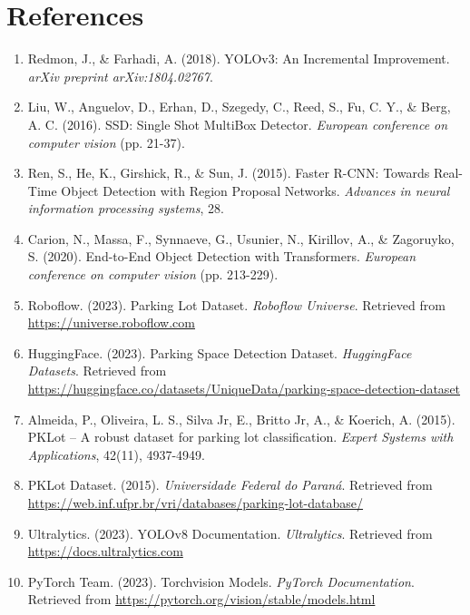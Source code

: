 \documentclass[12pt,a4paper]{article}
\begin{document}
\section{References}

\begin{enumerate}
    \item Redmon, J., \& Farhadi, A. (2018). YOLOv3: An Incremental Improvement. \textit{arXiv preprint arXiv:1804.02767}.
    
    \item Liu, W., Anguelov, D., Erhan, D., Szegedy, C., Reed, S., Fu, C. Y., \& Berg, A. C. (2016). SSD: Single Shot MultiBox Detector. \textit{European conference on computer vision} (pp. 21-37).
    
    \item Ren, S., He, K., Girshick, R., \& Sun, J. (2015). Faster R-CNN: Towards Real-Time Object Detection with Region Proposal Networks. \textit{Advances in neural information processing systems}, 28.
    
    \item Carion, N., Massa, F., Synnaeve, G., Usunier, N., Kirillov, A., \& Zagoruyko, S. (2020). End-to-End Object Detection with Transformers. \textit{European conference on computer vision} (pp. 213-229).
    
    \item Roboflow. (2023). Parking Lot Dataset. \textit{Roboflow Universe}. Retrieved from \url{https://universe.roboflow.com}
    
    \item HuggingFace. (2023). Parking Space Detection Dataset. \textit{HuggingFace Datasets}. Retrieved from \url{https://huggingface.co/datasets/UniqueData/parking-space-detection-dataset}
    
    \item Almeida, P., Oliveira, L. S., Silva Jr, E., Britto Jr, A., \& Koerich, A. (2015). PKLot – A robust dataset for parking lot classification. \textit{Expert Systems with Applications}, 42(11), 4937-4949.
    
    \item PKLot Dataset. (2015). \textit{Universidade Federal do Paraná}. Retrieved from \url{https://web.inf.ufpr.br/vri/databases/parking-lot-database/}
    
    \item Ultralytics. (2023). YOLOv8 Documentation. \textit{Ultralytics}. Retrieved from \url{https://docs.ultralytics.com}
    
    \item PyTorch Team. (2023). Torchvision Models. \textit{PyTorch Documentation}. Retrieved from \url{https://pytorch.org/vision/stable/models.html}
\end{enumerate}
\end{document}
